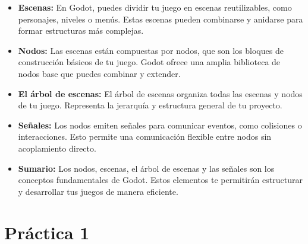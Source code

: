 \documentclass[12pt]{book} %
\begin{document}
\begin{itemize}
    \item \textbf{Escenas:} En Godot, puedes dividir tu juego en escenas reutilizables, como personajes, niveles o menús. Estas escenas pueden combinarse y anidarse para formar estructuras más complejas.

    \item \textbf{Nodos:} Las escenas están compuestas por nodos, que son los bloques de construcción básicos de tu juego. Godot ofrece una amplia biblioteca de nodos base que puedes combinar y extender.

    \item \textbf{El árbol de escenas:} El árbol de escenas organiza todas las escenas y nodos de tu juego. Representa la jerarquía y estructura general de tu proyecto.

    \item \textbf{Señales:} Los nodos emiten señales para comunicar eventos, como colisiones o interacciones. Esto permite una comunicación flexible entre nodos sin acoplamiento directo.

    \item \textbf{Sumario:} Los nodos, escenas, el árbol de escenas y las señales son los conceptos fundamentales de Godot. Estos elementos te permitirán estructurar y desarrollar tus juegos de manera eficiente.
\end{itemize}

\hypertarget{pruxe1ctica-1}{%
\chapter{Práctica 1}\label{pruxe1ctica-1}}




\end{document}
